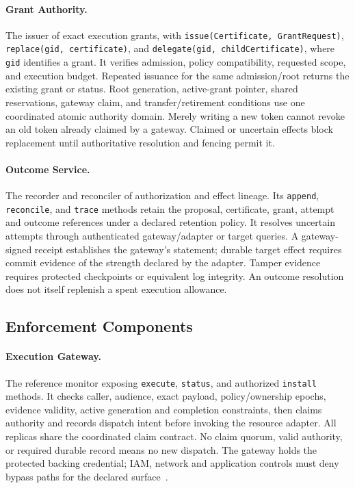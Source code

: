 \paragraph{Grant Authority.}
The issuer of exact execution grants, with \texttt{issue(Certificate, GrantRequest)}, \texttt{replace(gid, certificate)}, and \texttt{delegate(gid, childCertificate)}, where \texttt{gid} identifies a grant. It verifies admission, policy compatibility, requested scope, and execution budget. Repeated issuance for the same admission/root returns the existing grant or status. Root generation, active-grant pointer, shared reservations, gateway claim, and transfer/retirement conditions use one coordinated atomic authority domain. Merely writing a new token cannot revoke an old token already claimed by a gateway. Claimed or uncertain effects block replacement until authoritative resolution and fencing permit it.

\paragraph{Outcome Service.}
The recorder and reconciler of authorization and effect lineage. Its \texttt{append}, \texttt{reconcile}, and \texttt{trace} methods retain the proposal, certificate, grant, attempt and outcome references under a declared retention policy. It resolves uncertain attempts through authenticated gateway/adapter or target queries. A gateway-signed receipt establishes the gateway's statement; durable target effect requires commit evidence of the strength declared by the adapter. Tamper evidence requires protected checkpoints or equivalent log integrity. An outcome resolution does not itself replenish a spent execution allowance.

\subsection{Enforcement Components}
\paragraph{Execution Gateway.}
The reference monitor exposing \texttt{execute}, \texttt{status}, and authorized \texttt{install} methods. It checks caller, audience, exact payload, policy/ownership epochs, evidence validity, active generation and completion constraints, then claims authority and records dispatch intent before invoking the resource adapter. All replicas share the coordinated claim contract. No claim quorum, valid authority, or required durable record means no new dispatch. The gateway holds the protected backing credential; IAM, network and application controls must deny bypass paths for the declared surface~\cite{saltzer1975}.

